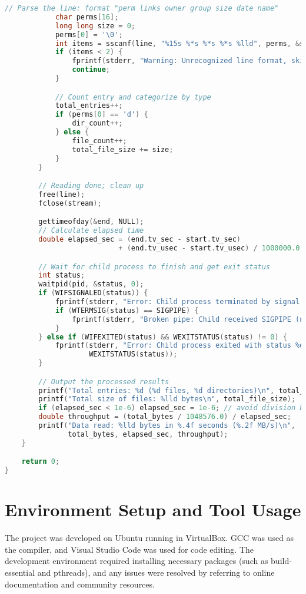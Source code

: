 \documentclass[11pt]{article}
\begin{document}
\begin{lstlisting}[language=C]
            // Parse the line: format "perm links owner group size date name"
            char perms[16];
            long long size = 0;
            perms[0] = '\0';
            int items = sscanf(line, "%15s %*s %*s %*s %lld", perms, &size);
            if (items < 2) {
                fprintf(stderr, "Warning: Unrecognized line format, skipping: %s\n", line);
                continue;
            }

            // Count entry and categorize by type
            total_entries++;
            if (perms[0] == 'd') {
                dir_count++;
            } else {
                file_count++;
                total_file_size += size;
            }
        }

        // Reading done; clean up
        free(line);
        fclose(stream);

        gettimeofday(&end, NULL);
        // Calculate elapsed time
        double elapsed_sec = (end.tv_sec - start.tv_sec)
                           + (end.tv_usec - start.tv_usec) / 1000000.0;

        // Wait for child process to finish and get exit status
        int status;
        waitpid(pid, &status, 0);
        if (WIFSIGNALED(status)) {
            fprintf(stderr, "Error: Child process terminated by signal %d\n", WTERMSIG(status));
            if (WTERMSIG(status) == SIGPIPE) {
                fprintf(stderr, "Broken pipe: Child received SIGPIPE (no reader)\n");
            }
        } else if (WIFEXITED(status) && WEXITSTATUS(status) != 0) {
            fprintf(stderr, "Error: Child process exited with status %d (ls command failed?)\n",
                    WEXITSTATUS(status));
        }

        // Output the processed results
        printf("Total entries: %d (%d files, %d directories)\n", total_entries, file_count, dir_count);
        printf("Total size of files: %lld bytes\n", total_file_size);
        if (elapsed_sec < 1e-6) elapsed_sec = 1e-6; // avoid division by zero
        double throughput = (total_bytes / 1048576.0) / elapsed_sec;
        printf("Data read: %lld bytes in %.4f seconds (%.2f MB/s)\n",
               total_bytes, elapsed_sec, throughput);
    }

    return 0;
}
\end{lstlisting}

\section{Environment Setup and Tool Usage}
The project was developed on Ubuntu running in VirtualBox. GCC was used as the compiler, and Visual Studio Code was used for code editing. The development environment required installing necessary packages (such as build-essential and pthreads), and any issues were resolved by referring to online documentation and community resources.
\end{document}
